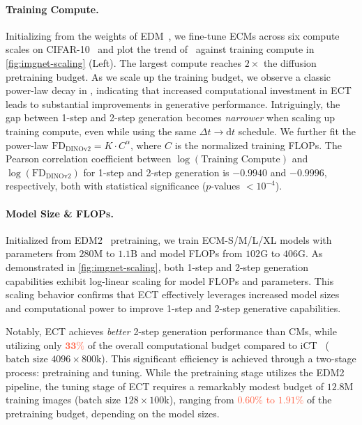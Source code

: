\documentclass{article}
\begin{document}
\paragraph{Training Compute.} 
%
Initializing from the weights of EDM~\citep{Karras2022edm}, we fine-tune ECMs across six compute scales on CIFAR-10~\citep{cifar} and plot the trend of \dino\ against training compute in \cref{fig:imgnet-scaling} (Left). The largest compute reaches $2\times$ the diffusion pretraining budget. As we scale up the training budget, we observe a classic power-law decay in \dino, indicating that increased computational investment in ECT leads to substantial improvements in generative performance. Intriguingly, the gap between 1-step and 2-step generation becomes \textit{narrower} when scaling up training compute, even while using the same $\Delta t \to \mathrm{d}t$ schedule. We further fit the power-law $\text{FD}_{\text{DINOv2}} = K \cdot C^\alpha$, where $C$ is the normalized training FLOPs. The Pearson correlation coefficient between $\log(\text{Training Compute})$ and $\log(\text{FD}_{\text{DINOv2}})$ for 1-step and 2-step generation is $-0.9940$ and $-0.9996$, respectively, both with statistical significance ($p$-values $< 10^{-4}$).
%
\vspace{-5pt}
\paragraph{Model Size \& FLOPs.} Initialized from EDM2~\citep{Karras2024edm2} pretraining, we train ECM-S/M/L/XL models with parameters from $280\mathrm{M}$ to $1.1\mathrm{B}$ and model FLOPs from $102\mathrm{G}$ to $406\mathrm{G}$. As demonstrated in \cref{fig:imgnet-scaling}, both 1-step and 2-step generation capabilities exhibit log-linear scaling for model FLOPs and parameters. This scaling behavior confirms that ECT effectively leverages increased model sizes and computational power to improve 1-step and 2-step generative capabilities. 

Notably, ECT achieves \textit{better} 2-step generation performance than \sota CMs, while utilizing only \textcolor{tomato}{$\mathbf{33\%}$} of the overall computational budget compared to iCT~\citep{ict} ($\text{batch size } 4096 \times 800\text{k}$). This significant efficiency is achieved through a two-stage process: pretraining and tuning. While the pretraining stage utilizes the EDM2 pipeline, the tuning stage of ECT requires a remarkably modest budget of $12.8\mathrm{M}$ training images ($\text{batch size } 128 \times 100\text{k}$), ranging from \textcolor{tomato}{$\mathbf{0.60\%}$ to $\mathbf{1.91\%}$} of the pretraining budget, depending on the model sizes. 
%
\vspace{-5pt}
\end{document}
